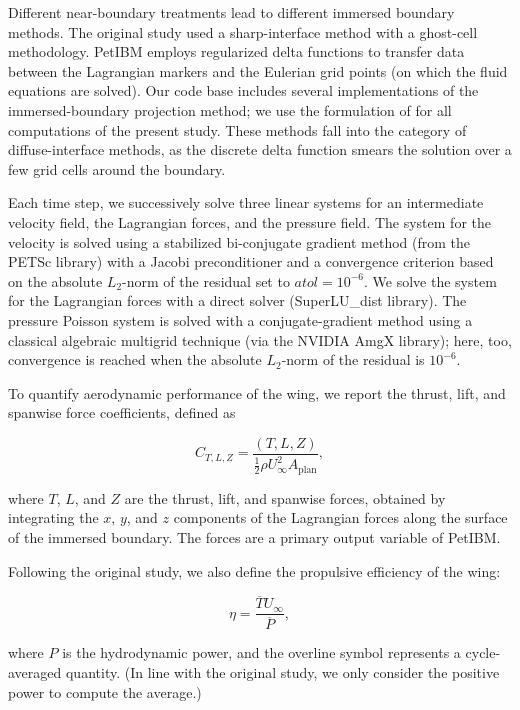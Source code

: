 Different near-boundary treatments lead to different immersed boundary methods.
The original study used a sharp-interface method with a ghost-cell methodology.\supercite{mittal_et_al_2008}
PetIBM employs regularized delta functions to transfer data between the Lagrangian markers and the Eulerian grid points (on which the fluid equations are solved).
Our code base includes several implementations of the immersed-boundary projection method;\supercite{taira_colonius_2007} we use the formulation of \citet{li_et_al_2016} for all computations of the present study.
These methods fall into the category of diffuse-interface methods, as the discrete delta function smears the solution over a few grid cells around the boundary.

Each time step, we successively solve three linear systems for an intermediate velocity field, the Lagrangian forces, and the pressure field.
The system for the velocity is solved using a stabilized bi-conjugate gradient method (from the PETSc library) with a Jacobi preconditioner and a convergence criterion based on the absolute $L_2$-norm of the residual set to $atol = 10^{-6}$.
We solve the system for the Lagrangian forces with a direct solver (SuperLU\_dist library).
The pressure Poisson system is solved with a conjugate-gradient method using a classical algebraic multigrid technique (via the NVIDIA AmgX library); here, too, convergence is reached when the absolute $L_2$-norm of the residual is $10^{-6}$.

To quantify aerodynamic performance of the wing, we report the thrust, lift, and spanwise force coefficients, defined as

\begin{equation}
  C_{T, L, Z} = \frac{\left( T, L, Z \right)}{\frac{1}{2} \rho U_\infty^2 A_\text{plan}},
\end{equation}

where $T$, $L$, and $Z$ are the thrust, lift, and spanwise forces, obtained by integrating the $x$, $y$, and $z$ components of the Lagrangian forces along the surface of the immersed boundary.
The forces are a primary output variable of PetIBM.

Following the original study, we also define the propulsive efficiency of the wing:

\begin{equation}
  \eta = \frac{\overline{T} U_\infty}{\overline{P}},
\end{equation}

where $P$ is the hydrodynamic power, and the overline symbol represents a cycle-averaged quantity.
(In line with the original study, we only consider the positive power to compute the average.)

